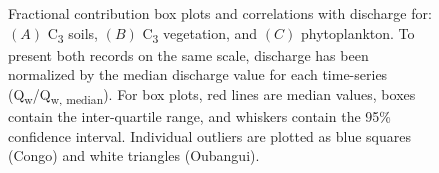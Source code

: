 \begin{figure}[p]
	\caption[Discharge vs. end-member fractional contribution]{Fractional contribution box plots and correlations with discharge for: $(A)$ C\textsubscript{3} soils, $(B)$ C\textsubscript{3} vegetation, and $(C)$ phytoplankton. To present both records on the same scale, discharge has been normalized by the median discharge value for each time-series (Q\textsubscript{w}/Q\textsubscript{w, median}). For box plots, red lines are median values, boxes contain the inter-quartile range, and whiskers contain the 95\% confidence interval. Individual outliers are plotted as blue squares (Congo) and white triangles (Oubangui).}
	\label{Ch5Fig:7} 
\end{figure}

